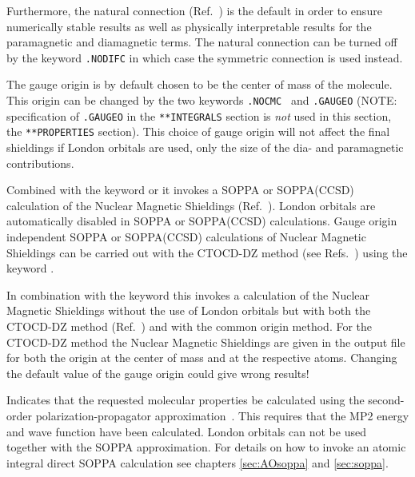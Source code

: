 \begin{description}
Furthermore, the natural connection
(Ref.~\cite{joklbkrthpjtca90,krthjopjklbcpl235}) is the default in order to ensure
numerically stable results as well as physically interpretable
results for the paramagnetic and diamagnetic terms. The natural
connection can be turned off by the keyword \verb|.NODIFC| in which
case the symmetric connection is used instead.

The gauge origin is by default chosen to be the center of
mass of the molecule.
This origin can be changed by the two keywords \verb|.NOCMC | and \verb|.GAUGEO|
(NOTE: specification of \verb|.GAUGEO| in the \verb|**INTEGRALS| section
is \emph{not} used in this section, the \verb|**PROPERTIES| section).
This choice of gauge origin will not affect
the final shieldings if London orbitals are used, only the size of the
dia- and paramagnetic contributions.

Combined with the keyword  or  it invokes a SOPPA
or SOPPA(CCSD) calculation of the Nuclear Magnetic Shieldings
(Ref.~\cite{paololazz1,paololazz2,ctocd}). London orbitals are automatically disabled in
SOPPA or SOPPA(CCSD)
calculations. Gauge origin independent SOPPA or SOPPA(CCSD) calculations of Nuclear
Magnetic Shieldings can be carried out with the CTOCD-DZ method
(see Refs.~\cite{paololazz1,paololazz2,ctocd}) using the keyword .

In combination with the keyword  this invokes a calculation of the
Nuclear Magnetic Shieldings without the use of London orbitals but with both
the CTOCD-DZ method (Ref.~\cite{paololazz1,paololazz2,ctocd}) and with the common
origin method. For the CTOCD-DZ method the Nuclear Magnetic Shieldings are given in
the output file for both the origin at the center of mass and at the respective atoms.
Changing the default value of the gauge origin could give wrong results!

\item[\Key{SOPPA}] Indicates that the requested molecular properties
be calculated using the second-order polarization-propagator
approximation~\cite{mjpekdtehjajjojcp}. This requires that
the MP2 energy and wave function have been calculated. London orbitals
can not be used together with the SOPPA approximation. For details on
how to invoke an atomic integral direct SOPPA calculation
\cite{spas037} see chapters \ref{sec:AOsoppa} and \ref{sec:soppa}.


\end{description}
